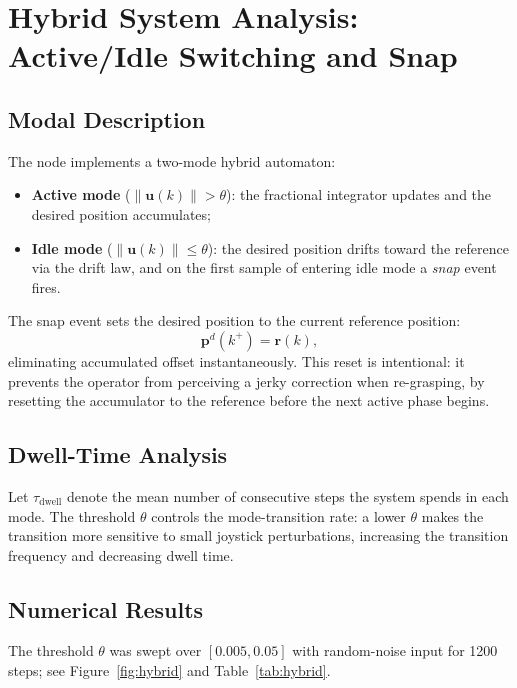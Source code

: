 \documentclass[11pt,a4paper]{article}
\theoremstyle{definition}
\begin{document}
\section{Hybrid System Analysis: Active/Idle Switching and Snap}
\label{sec:hybrid}

\subsection{Modal Description}

The node implements a two-mode hybrid automaton:
\begin{itemize}[noitemsep]
  \item \textbf{Active mode} ($\|\bm{u}(k)\| > \theta$): the fractional
        integrator updates and the desired position accumulates;
  \item \textbf{Idle mode} ($\|\bm{u}(k)\| \leq \theta$): the desired
        position drifts toward the reference via the drift law, and on the
        first sample of entering idle mode a \emph{snap} event fires.
\end{itemize}

The snap event sets the desired position to the current reference position:
\begin{equation}
  \bm{p}^d(k^+) = \bm{r}(k),
  \label{eq:snap}
\end{equation}
eliminating accumulated offset instantaneously.  This reset is intentional: it
prevents the operator from perceiving a jerky correction when re-grasping, by
resetting the accumulator to the reference before the next active phase begins.

\subsection{Dwell-Time Analysis}

Let $\tau_{\text{dwell}}$ denote the mean number of consecutive steps the
system spends in each mode.  The threshold $\theta$ controls the
mode-transition rate: a lower $\theta$ makes the transition more sensitive to
small joystick perturbations, increasing the transition frequency and
decreasing dwell time.

\subsection{Numerical Results}

The threshold $\theta$ was swept over $[0.005, 0.05]$ with random-noise input
for 1200 steps; see Figure~\ref{fig:hybrid} and Table~\ref{tab:hybrid}.
\end{document}
